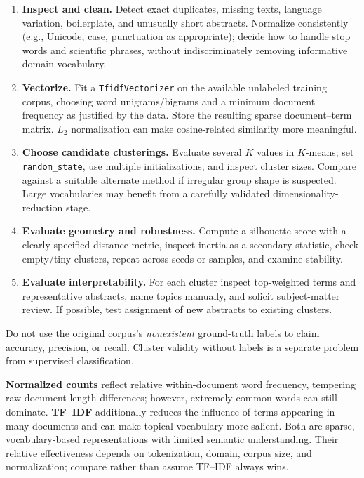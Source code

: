 \begin{enumerate}[label=\textbf{Step \arabic*.}]
\item \textbf{Inspect and clean.} Detect exact duplicates, missing texts, language variation, boilerplate, and unusually short abstracts. Normalize consistently (e.g., Unicode, case, punctuation as appropriate); decide how to handle stop words and scientific phrases, without indiscriminately removing informative domain vocabulary.
\item \textbf{Vectorize.} Fit a \texttt{TfidfVectorizer} on the available unlabeled training corpus, choosing word unigrams/bigrams and a minimum document frequency as justified by the data. Store the resulting sparse document--term matrix. $L_2$ normalization can make cosine-related similarity more meaningful.
\item \textbf{Choose candidate clusterings.} Evaluate several $K$ values in $K$-means; set \texttt{random\_state}, use multiple initializations, and inspect cluster sizes. Compare against a suitable alternate method if irregular group shape is suspected. Large vocabularies may benefit from a carefully validated dimensionality-reduction stage.
\item \textbf{Evaluate geometry and robustness.} Compute a silhouette score with a clearly specified distance metric, inspect inertia as a secondary statistic, check empty/tiny clusters, repeat across seeds or samples, and examine stability.
\item \textbf{Evaluate interpretability.} For each cluster inspect top-weighted terms and representative abstracts, name topics manually, and solicit subject-matter review. If possible, test assignment of new abstracts to existing clusters.
\end{enumerate}
\begin{important}
Do not use the original corpus's \emph{nonexistent} ground-truth labels to claim accuracy, precision, or recall. Cluster validity without labels is a separate problem from supervised classification.
\end{important}

\textbf{Normalized counts} reflect relative within-document word frequency, tempering raw document-length differences; however, extremely common words can still dominate. \textbf{TF--IDF} additionally reduces the influence of terms appearing in many documents and can make topical vocabulary more salient. Both are sparse, vocabulary-based representations with limited semantic understanding. Their relative effectiveness depends on tokenization, domain, corpus size, and normalization; compare rather than assume TF--IDF always wins.

